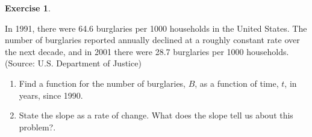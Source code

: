 \documentclass[10pt,]{book}
\theoremstyle{plain}
\theoremstyle{definition}
\newtheorem{exercise}[theorem]{Exercise}
\theoremstyle{definition}
\numberwithin{equation}{section}
\begin{document}
\begin{exercise}\label{exercise-burglaries}

In 1991, there were 64.6 burglaries per 1000 households in the United States. The number of burglaries reported annually declined at a roughly constant rate over the next decade, and in 2001 there were 28.7 burglaries per 1000 households. (Source: U.S. Department of Justice)
\leavevmode%
\begin{enumerate}[label=*\alph**]
\item\hypertarget{li-183}{}Find a function for the number of burglaries, \(B\), as a function of time, \(t\), in years, since 1990.
    \item\hypertarget{li-184}{}State the slope as a rate of change. What does the slope tell us about this problem?.
    \end{enumerate}
\end{exercise}
\typeout{************************************************}
\typeout{************************************************}
\end{document}

